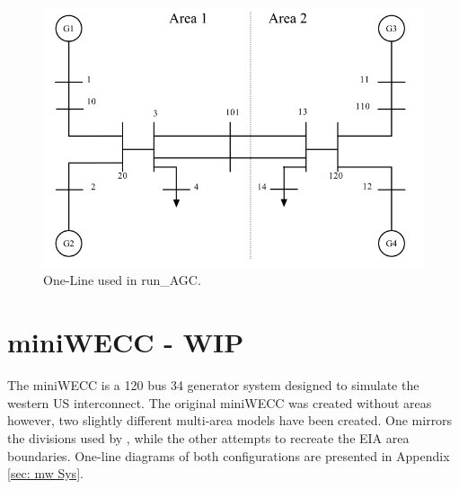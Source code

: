 \begin{figure}[H]
	\centering
	\footnotesize
	\includegraphics[width=.85\linewidth]{examples/agc/sysOneLineAreas}
	\caption{One-Line used in run\_AGC.}
	\label{fig: runAGC one line}
\end{figure}%







\pagebreak


\pagebreak
\section{miniWECC - WIP}
The miniWECC is a 120 bus 34 generator system designed to simulate the western US interconnect.
The original miniWECC was created without areas however, two slightly different multi-area models have been created.
One mirrors the divisions used by \cite{haines2020}, while the other attempts to recreate the EIA area boundaries.
One-line diagrams of both configurations are presented in Appendix \ref{sec: mw Sys}.


\pagebreak


